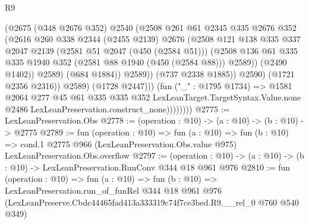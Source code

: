 \begin{lexlean}{R9}
\begin{coremodule}
                                  (@2675
                                    (@348 @2676 @352)
                                    @2540
                                    (@2508
                                      @261
                                      @61
                                      @2345
                                      @335
                                      @2676
                                      @352
                                      (@2616
                                        @260
                                        @338
                                        @2344
                                        (@2455 @2139)
                                        @2676
                                        (@2508
                                          @121
                                          @138
                                          @335
                                          @337
                                          @2047
                                          @2139
                                          (@2581 @51 @2047 (@450 (@2584 @51)))
                                          (@2508
                                            @136
                                            @61
                                            @335
                                            @335
                                            @1940
                                            @352
                                            (@2581 @88 @1940 (@450 (@2584 @88)))
                                            @2589))
                                        (@2490 @1402))
                                      @2589)
                                    (@684 @1884))
                                  @2589))
                              (@737 @2338 @1885))
                            @2590)
                          (@1721 @2356 @2316))
                        @2589)
                      (@1728 @2447)))
                  (fun ("_" : @1795 @1734) =>
                  @1581
                    @2064
                    @277
                    @45
                    @61
                    @335
                    @335
                    @352
                    LexLeanTarget.TargetSyntax.Value.none
                    @2486
                    LexLeanPreservation.construct_none))))))))
@2775 := LexLeanPreservation.Obs
@2778 := (operation : @10) -> (a : @10) -> (b : @10) -> @2775
@2789 := fun (operation : @10) =>
  fun (a : @10) =>
  fun (b : @10) =>
  cond.{1} @2775 @966 (LexLeanPreservation.Obs.value @975) LexLeanPreservation.Obs.overflow
@2797 := (operation : @10) ->
  (a : @10) -> (b : @10) -> LexLeanPreservation.RunConv @344 @18 @961 @976
@2810 := fun (operation : @10) =>
  fun (a : @10) =>
  fun (b : @10) =>
  LexLeanPreservation.run_of_funRel
    @344
    @18
    @961
    @976
    (LexLeanPreserve.Cbdc44465fad413a333319c74f7ce3bed.R9.__rel_0 @760 @540 @349)
\end{coremodule}
\end{lexlean}
